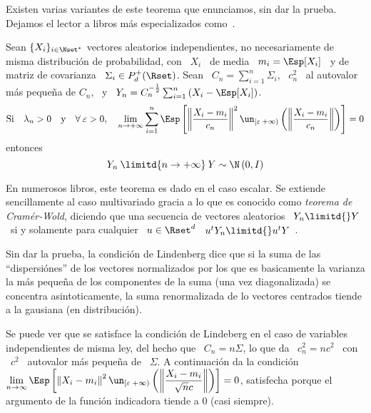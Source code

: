 Existen  varias   variantes  de  este   teorema  que  enunciamos,  sin   dar  la
prueba.  Dejamos el  lector a  libros m\'as  especializados como~\cite{AshDol99,
  Bil12, AthLah06, Lin22}.

\begin{teorema}\label{Teo:MP:LindenbergFeller}
%
  Sean  $\{  X_i \}_{i  \in  \Nset^*}$  vectores  aleatorios independientes,  no
  necesariamente de misma distribuci\'on de probabilidad, con \ $X_i$ \ de media
  \ $m_i = \Esp[X_i]$ \ y de matriz de covarianza \ $\Sigma_i \in P_d^+(\Rset)$.
  Sean \ $C_n = \sum_{i=1}^n \Sigma_i$, \ $c_n^2$ \ al autovalor m\'as peque\~na
  de $C_n$,  \ y  \ $Y_n  = C_n^{-\frac12} \sum_{i=1}^n  \left( X_i  - \Esp[X_i]
  \right)$.
  \[
  \mbox{Si} \quad \lambda_n > 0 \quad \mbox{y} \quad \forall \: \varepsilon > 0,
  \quad  \lim_{n  \to  +\infty}  \sum_{i=1}^n  \Esp\left[  \left\|  \frac{X_i  -
        m_i}{c_n} \right\|^2  \un_{\left[ \varepsilon \;  +\infty \right)}\left(
      \left\| \frac{X_i - m_i}{c_n} \right\| \right) \right] = 0
  \]
  entonces
  \[
  Y_n \: \limitd{n \to +\infty} \: Y \sim \N\left( 0 , I \right)
  \]
\end{teorema}
%
En  numerosos libros,  este teorema  es  dado en  el caso  escalar. Se  extiende
sencillamente al caso multivariado gracia a lo que es conocido como {\it teorema
  de Cram\'er-Wold},  diciendo que una  secuencia de vectores aleatorios  \ $Y_n
\limitd{}  Y$ \  si y  solamente para  cualquier \  $u \in  \Rset^d$ \  $u^t Y_n
\limitd{} u^t Y$~\cite{AshDol99, AthLah06, Bil12}.

Sin dar  la prueba,  la condici\'on  de Lindenberg dice  que si  la suma  de las
``dispersi\'ones'' de  los vectores normalizados  por los que es  basicamente la
varianza  la   m\'as  peque\~na  de  los   componentes  de  la   suma  (una  vez
diagonalizada)  se  concentra  asintoticamente,  la  suma  renormalizada  de  lo
vectores centrados tiende a la gausiana (en distribuci\'on).

Se  puede ver  que  se  satisface la  condici\'on  de Lindeberg  en  el caso  de
variables independientes de misma ley, del hecho  que \ $C_n = n \Sigma$, lo que
da \ $c_n^2 = n c^2$ \ con  \ $c^2$ \ autovalor m\'as peque\~na de \ $\Sigma$. A
continuaci\'on da la condici\'on \ $\displaystyle \lim_{n \to \infty} \Esp\left[
  \left\| X_i - m_i \right\|^2 \un_{\left[ \varepsilon \; +\infty \right)}\left(
    \left\|  \frac{X_i  -  m_i}{\sqrt{n}  c}  \right\|  \right)  \right]  =  0$,
satisfecha  porque el  argumento de  la funci\'on  indicadora tiende  a  0 (casi
siempre).

